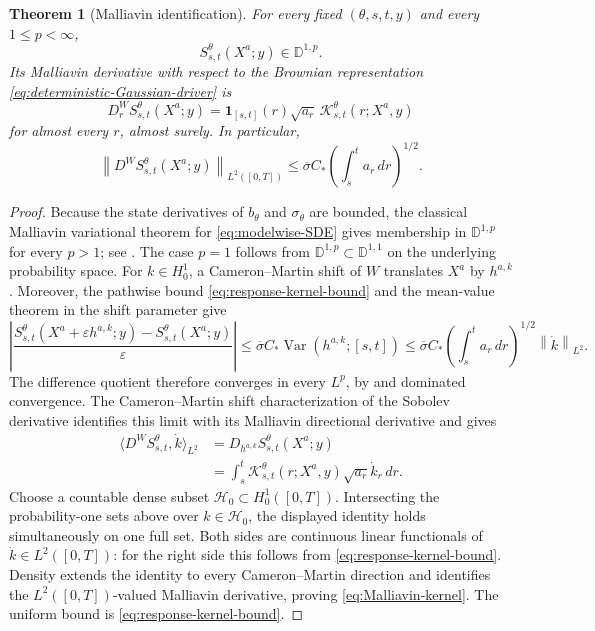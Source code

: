 \documentclass[11pt,reqno]{amsart}
\theoremstyle{plain}
\newtheorem{theorem}{Theorem}[section]
\theoremstyle{definition}
\newcommand{\eps}{\varepsilon}
\newcommand{\one}{\mathbf 1}
\newcommand{\dd}{\,d}
\newcommand{\Var}{\operatorname{Var}}
\newcommand{\norm}[1]{\left\lVert #1\right\rVert}
\begin{document}
\begin{theorem}[Malliavin identification]\label{thm:malliavin-identification}
For every fixed \((\theta,s,t,y)\) and every \(1\le p<\infty\),
\[
  S_{s,t}^\theta(X^a;y)\in\mathbb D^{1,p}.
\]
Its Malliavin derivative with respect to the Brownian representation
\eqref{eq:deterministic-Gaussian-driver} is
\begin{equation}\label{eq:Malliavin-kernel}
  D_r^W S_{s,t}^\theta(X^a;y)
  =
  \one_{[s,t]}(r)\sqrt{a_r}\,
  \mathcal K_{s,t}^\theta(r;X^a,y)
\end{equation}
for almost every \(r\), almost surely.  In particular,
\begin{equation}\label{eq:Malliavin-uniform-bound}
  \norm{D^WS_{s,t}^\theta(X^a;y)}_{L^2([0,T])}
  \le
  \overline\sigma C_*
  \left(\int_s^t a_r\dd r\right)^{1/2}.
\end{equation}
\end{theorem}

\begin{proof}
Because the state derivatives of \(b_\theta\) and \(\sigma_\theta\) are
bounded, the classical Malliavin variational theorem for
\eqref{eq:modelwise-SDE} gives membership in \(\mathbb D^{1,p}\) for every
\(p>1\); see \cite[Theorem~2.2.1]{Nualart06}.  The case \(p=1\) follows
from \(\mathbb D^{1,p}\subset\mathbb D^{1,1}\) on the underlying probability
space.  For \(k\in H_0^1\), a Cameron--Martin shift of \(W\)
translates \(X^a\) by \(h^{a,k}\).  Moreover, the pathwise bound
\eqref{eq:response-kernel-bound} and the mean-value theorem in the shift
parameter give
\[
  \left|
    \frac{
      S_{s,t}^\theta(X^a+\eps h^{a,k};y)
      -S_{s,t}^\theta(X^a;y)
    }{\eps}
  \right|
  \le
  \overline\sigma C_*\Var(h^{a,k};[s,t])
  \le
  \overline\sigma C_*
  \left(\int_s^t a_r\dd r\right)^{1/2}
  \norm{\dot k}_{L^2}.
\]
The difference quotient therefore converges in every \(L^p\), by
 and dominated convergence.  The
Cameron--Martin shift characterization of the Sobolev derivative identifies
this limit with its Malliavin directional derivative and gives
\begin{align*}
  \langle D^WS_{s,t}^\theta,\dot k\rangle_{L^2}
  &=D_{h^{a,k}}S_{s,t}^\theta(X^a;y)\\
  &=\int_s^t
    \mathcal K_{s,t}^\theta(r;X^a,y)
    \sqrt{a_r}\dot k_r\dd r.
\end{align*}
Choose a countable dense subset \(\mathcal H_0\subset H_0^1([0,T])\).
Intersecting the probability-one sets above over \(k\in\mathcal H_0\), the
displayed identity holds simultaneously on one full set.  Both sides are
continuous linear functionals of \(\dot k\in L^2([0,T])\): for the right
side this follows from \eqref{eq:response-kernel-bound}.  Density extends
the identity to every Cameron--Martin direction and identifies the
\(L^2([0,T])\)-valued Malliavin derivative, proving
\eqref{eq:Malliavin-kernel}.  The uniform bound is
\eqref{eq:response-kernel-bound}.
\end{proof}
\end{document}
